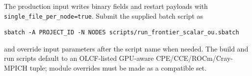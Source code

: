 \documentclass[10pt]{article}
\begin{document}
The production input writes binary fields and restart payloads with
\texttt{single\_file\_per\_node=true}.  Submit the supplied batch script as
\begin{verbatim}
sbatch -A PROJECT_ID -N NODES scripts/run_frontier_scalar_ou.sbatch
\end{verbatim}
and override input parameters after the script name when needed.  The build
and run scripts default to an OLCF-listed GPU-aware CPE/CCE/ROCm/Cray-MPICH
tuple; module overrides must be made as a compatible set.
\end{document}
